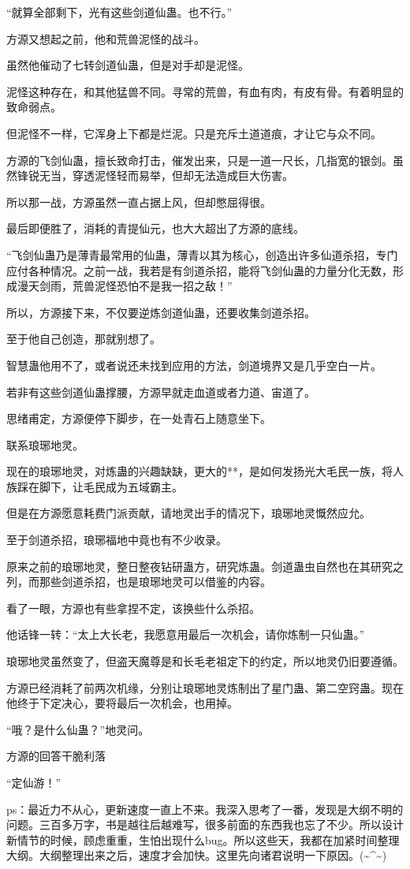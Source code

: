 \begin{this_body}
“就算全部剩下，光有这些剑道仙蛊。也不行。”

方源又想起之前，他和荒兽泥怪的战斗。

虽然他催动了七转剑道仙蛊，但是对手却是泥怪。

泥怪这种存在，和其他猛兽不同。寻常的荒兽，有血有肉，有皮有骨。有着明显的致命弱点。

但泥怪不一样，它浑身上下都是烂泥。只是充斥土道道痕，才让它与众不同。

方源的飞剑仙蛊，擅长致命打击，催发出来，只是一道一尺长，几指宽的银剑。虽然锋锐无当，穿透泥怪轻而易举，但却无法造成巨大伤害。

所以那一战，方源虽然一直占据上风，但却憋屈得很。

最后即便胜了，消耗的青提仙元，也大大超出了方源的底线。

“飞剑仙蛊乃是薄青最常用的仙蛊，薄青以其为核心，创造出许多仙道杀招，专门应付各种情况。之前一战，我若是有剑道杀招，能将飞剑仙蛊的力量分化无数，形成漫天剑雨，荒兽泥怪恐怕不是我一招之敌！”

所以，方源接下来，不仅要逆炼剑道仙蛊，还要收集剑道杀招。

至于他自己创造，那就别想了。

智慧蛊他用不了，或者说还未找到应用的方法，剑道境界又是几乎空白一片。

若非有这些剑道仙蛊撑腰，方源早就走血道或者力道、宙道了。

思绪甫定，方源便停下脚步，在一处青石上随意坐下。

联系琅琊地灵。

现在的琅琊地灵，对炼蛊的兴趣缺缺，更大的**，是如何发扬光大毛民一族，将人族踩在脚下，让毛民成为五域霸主。

但是在方源愿意耗费门派贡献，请地灵出手的情况下，琅琊地灵慨然应允。

至于剑道杀招，琅琊福地中竟也有不少收录。

原来之前的琅琊地灵，整日整夜钻研蛊方，研究炼蛊。剑道蛊虫自然也在其研究之列，而那些剑道杀招，也是琅琊地灵可以借鉴的内容。

看了一眼，方源也有些拿捏不定，该换些什么杀招。

他话锋一转：“太上大长老，我愿意用最后一次机会，请你炼制一只仙蛊。”

琅琊地灵虽然变了，但盗天魔尊是和长毛老祖定下的约定，所以地灵仍旧要遵循。

方源已经消耗了前两次机缘，分别让琅琊地灵炼制出了星门蛊、第二空窍蛊。现在他终于下定决心，要将最后一次机会，也用掉。

“哦？是什么仙蛊？”地灵问。

方源的回答干脆利落

“定仙游！”

ps：最近力不从心，更新速度一直上不来。我深入思考了一番，发现是大纲不明的问题。三百多万字，书是越往后越难写，很多前面的东西我也忘了不少。所以设计新情节的时候，顾虑重重，生怕出现什么bug。所以这些天，我都在加紧时间整理大纲。大纲整理出来之后，速度才会加快。这里先向诸君说明一下原因。(\~{}\^{}\~{})

\end{this_body}

